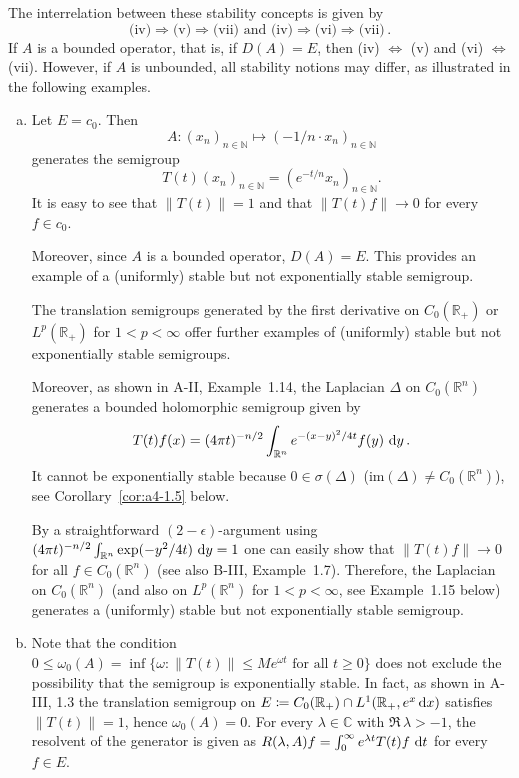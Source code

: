 The interrelation between these stability concepts is given by
\[
\text{(iv)} \Rightarrow \text{(v)} \Rightarrow \text{(vii)} \text{ and } \text{(iv)} \Rightarrow \text{(vi)} \Rightarrow \text{(vii)}\,.
\]
If $A$ is a bounded operator, that is, if $D(A) = E$, then (iv) $\Leftrightarrow$ (v) and (vi) $\Leftrightarrow$ (vii).
However, if $A$ is unbounded, all stability notions may differ, as illustrated in the following examples.
\begin{example}\label{ex:a4-1.2}
\begin{enumerate}[(a), wide, labelsep=1em]

\item 
Let $E = c_{0}$. 
Then 
\[
A \colon (x_{n})_{n \in \mathbb{N}} \mapsto (-1/n \cdot x_{n})_{n \in \mathbb{N}}
\] 
generates the semigroup 
\[
T(t)(x_{n})_{n \in \mathbb{N}} = (e^{-t/n} x_{n})_{n \in \mathbb{N}}.
\]
It is easy to see that $\|T(t)\|=1$ and that $\|T(t)f\|\to 0$ for every $f \in c_{0}$.

Moreover, since $A$ is a bounded operator, $D(A) = E$.
This provides an example of a (uniformly) stable but not exponentially stable semigroup.

The translation semigroups generated by the first derivative on $C_0(\mathbb{R}_{+})$ or $L^{p}(\mathbb{R}_{+})$ for $1 < p < \infty$ offer further examples of (uniformly) stable but not exponentially stable semigroups.

Moreover, as shown in A-II, Example~1.14, the Laplacian $\Delta$ on $C_0(\mathbb{R}^{n})$ generates a bounded holomorphic semigroup given by
\[
T(t)f(x) = (4\pi t)^{-n/2} \int_{\mathbb{R}^{n}} e^{-(x-y)^{2}/4t} f(y) \,\mathop{}\!\mathrm{d}{y}\,.
\]
It cannot be exponentially stable because $0 \in \sigma(\Delta)$ ($\textrm{im}(\Delta) \not= C_0(\mathbb{R}^{n})$), see Corollary~\ref{cor:a4-1.5} below.

By a straightforward $(2-\epsilon)$-argument using $(4\pi t)^{-n/2}\int_{\mathbb{R}^{n}} \exp(-y^{2}/4t) \,\mathop{}\!\mathrm{d}{y} = 1$ one can easily show that $\|T(t)f\| \to 0$ for all $f \in C_0(\mathbb{R}^{n})$ (see also B-III, Example~1.7).
Therefore, the Laplacian on $C_0(\mathbb{R}^{n})$ (and also on $L^{p}(\mathbb{R}^{n})$ for $1 < p < \infty$, see Example~1.15 below) generates a (uniformly) stable but not exponentially stable semigroup.

\item 
Note that the condition $0 \leq \omega_0(A) = \inf\{\omega\colon\|T(t)\| \leq Me^{\omega t} \text{ for all } t \geq 0\}$ does not exclude the possibility that the semigroup is exponentially stable.
In fact, as shown in A-III, 1.3 the translation semigroup on $E \coloneqq C_0(\mathbb{R}_{+}) \cap L^{1}(\mathbb{R}_{+},e^{x}\mathop{}\!\mathrm{d}{x})$ satisfies $\|T(t)\| = 1$, hence $\omega_0(A) = 0$. 
For every $\lambda \in \mathbb{C}$ with $\Re\,\lambda > -1$, the resolvent of the generator is given as $R(\lambda,A)f = \int_{0}^{\infty} e^{\lambda t} T(t)f \,\mathop{}\!\mathrm{d}{t}$ for every $f \in E$.


\end{enumerate}
\end{example}
